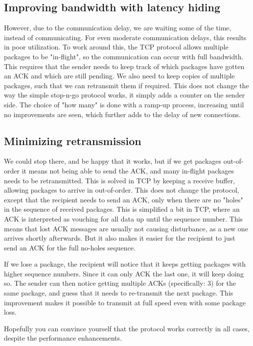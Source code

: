 \subsection{Improving bandwidth with latency hiding}
However, due to the communication delay, we are waiting some of the time, instead of communicating. For even moderate communication delays, this results in poor utilization. To work around this, the TCP protocol allows multiple packages to be "in-flight", so the communication can occur with full bandwidth. This requires that the sender needs to keep track of which packages have gotten an ACK and which are still pending. We also need to keep copies of multiple packages, such that we can retransmit them if required. This does not change the way the simple stop-n-go protocol works, it simply adds a counter on the sender side. The choice of "how many" is done with a ramp-up process, increasing until no improvements are seen, which further adds to the delay of new connections.

\subsection{Minimizing retransmission}
We could stop there, and be happy that it works, but if we get packages out-of-order it means not being able to send the ACK, and many in-flight packages needs to be retransmitted. This is solved in TCP by keeping a receive buffer, allowing packages to arrive in out-of-order. This does not change the protocol, except that the recipient needs to send an ACK, only when there are no "holes" in the sequence of received packages. This is simplified a bit in TCP, where an ACK is interpreted as vouching for all data up until the sequence number. This means that lost ACK messages are usually not causing disturbance, as a new one arrives shortly afterwards. But it also makes it easier for the recipient to just send an ACK for the full no-holes sequence.

If we lose a package, the recipient will notice that it keeps getting packages with higher sequence numbers. Since it can only ACK the last one, it will keep doing so. The sender can then notice getting multiple ACKs (specifically: 3) for the same package, and guess that it needs to re-transmit the next package. This improvement makes it possible to transmit at full speed even with some package loss.

Hopefully you can convince yourself that the protocol works correctly in all cases, despite the performance enhancements.

